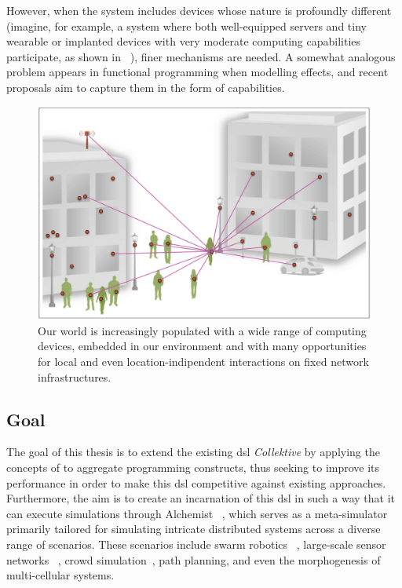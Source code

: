 However, when the system includes devices whose nature is profoundly different (imagine, for example, a system where both
well-equipped servers and tiny wearable or implanted devices with very moderate computing capabilities participate, as
shown in ~), finer mechanisms are needed.
A somewhat analogous problem appears in functional programming when modelling effects, and recent proposals aim to capture
them in the form of capabilities.

\begin{figure} %
    \centering
    \includegraphics[width=.8\linewidth]{figures/smart-network-objects}
    \caption{Our world is increasingly populated with a wide range of computing devices, embedded in our environment
    and with many opportunities for local and even location-indipendent interactions on fixed network infrastructures.}
    \label{fig:smart-network-objects}
\end{figure}

\subsection{Goal}
\label{subsec:goal}
The goal of this thesis is to extend the existing \ac{dsl} \emph{Collektive} by applying the concepts of \xc{} to
aggregate programming constructs, thus seeking to improve its performance in order to make this \ac{dsl} competitive
against existing approaches.
Furthermore, the aim is to create an incarnation of this \ac{dsl} in such a way that it can execute simulations through
Alchemist ~\cite{10.1007/978-3-030-78198-9_10}, which serves as a meta-simulator primarily tailored for simulating
intricate distributed systems across a diverse range of scenarios.
These scenarios include swarm robotics ~\cite{aguzzi2024macroswarm}, large-scale sensor networks ~\cite{9927406}, crowd
simulation~\cite{7274429}, path planning, and even the morphogenesis of multi-cellular systems.

